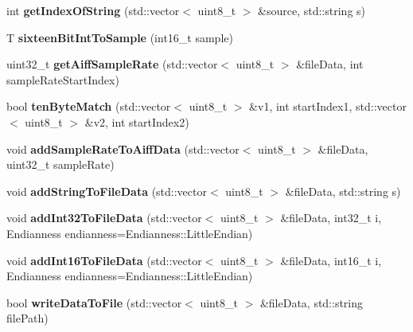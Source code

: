 \begin{DoxyCompactItemize}
int {\bfseries get\+Index\+Of\+String} (std\+::vector$<$ uint8\+\_\+t $>$ \&source, std\+::string s)
\item 
\mbox{\label{class_audio_file_a2ff18ea40f28f1758f0ca78b2185c789}} 
T {\bfseries sixteen\+Bit\+Int\+To\+Sample} (int16\+\_\+t sample)
\item 
\mbox{\label{class_audio_file_afd351555e7868d1c9cbf77d93edc09dd}} 
uint32\+\_\+t {\bfseries get\+Aiff\+Sample\+Rate} (std\+::vector$<$ uint8\+\_\+t $>$ \&file\+Data, int sample\+Rate\+Start\+Index)
\item 
\mbox{\label{class_audio_file_a801f2c42d590c1fcba274c6d1f70cfbc}} 
bool {\bfseries ten\+Byte\+Match} (std\+::vector$<$ uint8\+\_\+t $>$ \&v1, int start\+Index1, std\+::vector$<$ uint8\+\_\+t $>$ \&v2, int start\+Index2)
\item 
\mbox{\label{class_audio_file_aa25ff369a0e2ca315c7abf3982ef1c18}} 
void {\bfseries add\+Sample\+Rate\+To\+Aiff\+Data} (std\+::vector$<$ uint8\+\_\+t $>$ \&file\+Data, uint32\+\_\+t sample\+Rate)
\item 
\mbox{\label{class_audio_file_a21b500e75c67e28f38554c2eb752e24b}} 
void {\bfseries add\+String\+To\+File\+Data} (std\+::vector$<$ uint8\+\_\+t $>$ \&file\+Data, std\+::string s)
\item 
\mbox{\label{class_audio_file_add8628d661b806fbba0e28231da97563}} 
void {\bfseries add\+Int32\+To\+File\+Data} (std\+::vector$<$ uint8\+\_\+t $>$ \&file\+Data, int32\+\_\+t i, Endianness endianness=Endianness\+::\+Little\+Endian)
\item 
\mbox{\label{class_audio_file_aba8b98835fdc51bc9d0e04634c70603a}} 
void {\bfseries add\+Int16\+To\+File\+Data} (std\+::vector$<$ uint8\+\_\+t $>$ \&file\+Data, int16\+\_\+t i, Endianness endianness=Endianness\+::\+Little\+Endian)
\item 
\mbox{\label{class_audio_file_a734c540c871a3843f01f908bbfc3962d}} 
bool {\bfseries write\+Data\+To\+File} (std\+::vector$<$ uint8\+\_\+t $>$ \&file\+Data, std\+::string file\+Path)
\end{DoxyCompactItemize}
